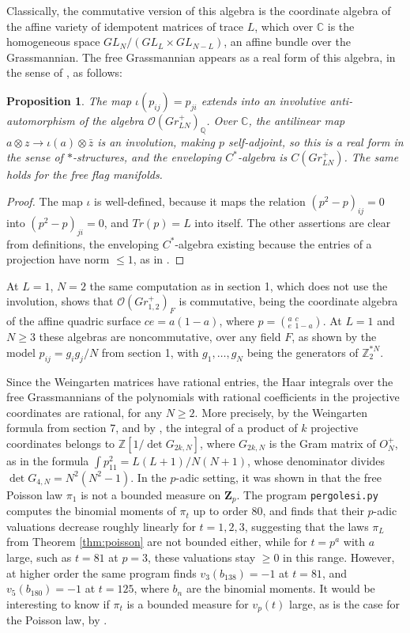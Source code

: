 \documentclass[11pt]{article}
\theoremstyle{plain}
\newtheorem{proposition}[theorem]{Proposition}
\begin{document}
Classically, the commutative version of this algebra is the coordinate algebra of the affine variety of idempotent matrices of trace $L$, which over $\mathbb C$ is the homogeneous space $GL_N/(GL_L\times GL_{N-L})$, an affine bundle over the Grassmannian. The free Grassmannian appears as a real form of this algebra, in the sense of \cite{oba}, as follows:

\begin{proposition}
\label{prop:realform}
The map $\iota(p_{ij})=p_{ji}$ extends into an involutive anti-automorphism of the algebra $\mathcal O(Gr^+_{LN})_\mathbb Q$. Over $\mathbb C$, the antilinear map $a\otimes z\to\iota(a)\otimes\bar{z}$ is an involution, making $p$ self-adjoint, so this is a real form in the sense of $*$-structures, and the enveloping $C^*$-algebra is $C(Gr^+_{LN})$. The same holds for the free flag manifolds.
\end{proposition}

\begin{proof}
The map $\iota$ is well-defined, because it maps the relation $(p^2-p)_{ij}=0$ into $(p^2-p)_{ji}=0$, and $Tr(p)=L$ into itself. The other assertions are clear from definitions, the enveloping $C^*$-algebra existing because the entries of a projection have norm $\leq1$, as in \cite{oba}.
\end{proof}

At $L=1$, $N=2$ the same computation as in section 1, which does not use the involution, shows that $\mathcal O(Gr^+_{1,2})_F$ is commutative, being the coordinate algebra of the affine quadric surface $ce=a(1-a)$, where $p=(^a_e{\ }^c_{1-a})$. At $L=1$ and $N\geq3$ these algebras are noncommutative, over any field $F$, as shown by the model $p_{ij}=g_ig_j/N$ from section 1, with $g_1,\ldots,g_N$ being the generators of $\mathbb Z_2^{*N}$.

Since the Weingarten matrices have rational entries, the Haar integrals over the free Grassmannians of the polynomials with rational coefficients in the projective coordinates are rational, for any $N\geq2$. More precisely, by the Weingarten formula from section 7, and by \cite{oba}, the integral of a product of $k$ projective coordinates belongs to $\mathbb Z[1/\det G_{2k,N}]$, where $G_{2k,N}$ is the Gram matrix of $O_N^+$, as in the formula $\int p_{11}^2=L(L+1)/N(N+1)$, whose denominator divides $\det G_{4,N}=N^2(N^2-1)$. In the $p$-adic setting, it was shown in \cite{oba} that the free Poisson law $\pi_1$ is not a bounded measure on $\mathbf Z_p$. The program {\tt pergolesi.py} computes the binomial moments of $\pi_t$ up to order 80, and finds that their $p$-adic valuations decrease roughly linearly for $t=1,2,3$, suggesting that the laws $\pi_L$ from Theorem \ref{thm:poisson} are not bounded either, while for $t=p^a$ with $a$ large, such as $t=81$ at $p=3$, these valuations stay $\geq0$ in this range. However, at higher order the same program finds $v_3(b_{138})=-1$ at $t=81$, and $v_5(b_{180})=-1$ at $t=125$, where $b_n$ are the binomial moments. It would be interesting to know if $\pi_t$ is a bounded measure for $v_p(t)$ large, as is the case for the Poisson law, by \cite{oba}.
\end{document}
